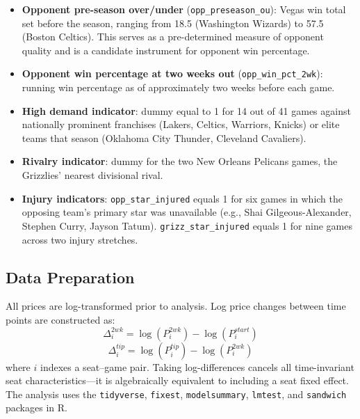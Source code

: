 \documentclass[12pt]{article}
\begin{document}
\begin{itemize}
    \item \textbf{Opponent pre-season over/under} (\texttt{opp\_preseason\_ou}): Vegas win total set before the season, ranging from 18.5 (Washington Wizards) to 57.5 (Boston Celtics). This serves as a pre-determined measure of opponent quality and is a candidate instrument for opponent win percentage.
    \item \textbf{Opponent win percentage at two weeks out} (\texttt{opp\_win\_pct\_2wk}): running win percentage as of approximately two weeks before each game.
    \item \textbf{High demand indicator}: dummy equal to 1 for 14 out of 41 games against nationally prominent franchises (Lakers, Celtics, Warriors, Knicks) or elite teams that season (Oklahoma City Thunder, Cleveland Cavaliers).
    \item \textbf{Rivalry indicator}: dummy for the two New Orleans Pelicans games, the Grizzlies' nearest divisional rival.
    \item \textbf{Injury indicators}: \texttt{opp\_star\_injured} equals 1 for six games in which the opposing team's primary star was unavailable (e.g., Shai Gilgeous-Alexander, Stephen Curry, Jayson Tatum). \texttt{grizz\_star\_injured} equals 1 for nine games across two injury stretches.
\end{itemize}
 
\subsection{Data Preparation}
 
All prices are log-transformed prior to analysis. Log price changes between time points are constructed as:
\begin{equation}
    \Delta^{2wk}_i = \log(P^{2wk}_i) - \log(P^{start}_i)
    \label{eq:delta2wk}
\end{equation}
\begin{equation}
    \Delta^{tip}_i = \log(P^{tip}_i) - \log(P^{2wk}_i)
    \label{eq:deltatip}
\end{equation}
where $i$ indexes a seat--game pair. Taking log-differences cancels all time-invariant seat characteristics---it is algebraically equivalent to including a seat fixed effect. The analysis uses the \texttt{tidyverse}, \texttt{fixest}, \texttt{modelsummary}, \texttt{lmtest}, and \texttt{sandwich} packages in R.
 
 
\end{document}
